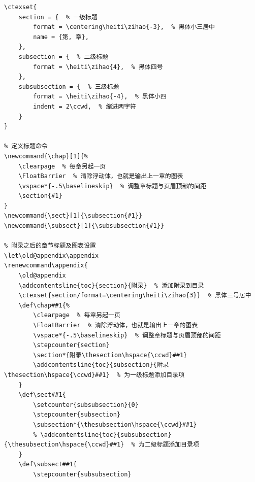 \begin{lstlisting}[numbers=none,frame=none]
% 章节标题
\ctexset{
	section = {  % 一级标题
		format = \centering\heiti\zihao{-3},  % 黑体小三居中
		name = {第, 章},
	},
	subsection = {  % 二级标题
		format = \heiti\zihao{4},  % 黑体四号
	},
	subsubsection = {  % 三级标题
		format = \heiti\zihao{-4},  % 黑体小四
        indent = 2\ccwd,  % 缩进两字符
	}
}

% 定义标题命令
\newcommand{\chap}[1]{%
	\clearpage  % 每章另起一页
    \FloatBarrier  % 清除浮动体，也就是输出上一章的图表
    \vspace*{-.5\baselineskip}  % 调整章标题与页眉顶部的间距
	\section{#1}
}
\newcommand{\sect}[1]{\subsection{#1}}
\newcommand{\subsect}[1]{\subsubsection{#1}}

% 附录之后的章节标题及图表设置
\let\old@appendix\appendix
\renewcommand\appendix{
    \old@appendix
    \addcontentsline{toc}{section}{附录}  % 添加附录到目录
    \ctexset{section/format=\centering\heiti\zihao{3}}  % 黑体三号居中
    \def\chap##1{%
        \clearpage  % 每章另起一页
        \FloatBarrier  % 清除浮动体，也就是输出上一章的图表
        \vspace*{-.5\baselineskip}  % 调整章标题与页眉顶部的间距
        \stepcounter{section}
        \section*{附录\thesection\hspace{\ccwd}##1}
        \addcontentsline{toc}{subsection}{附录\thesection\hspace{\ccwd}##1}  % 为一级标题添加目录项
    }
    \def\sect##1{
        \setcounter{subsubsection}{0}
        \stepcounter{subsection}
        \subsection*{\thesubsection\hspace{\ccwd}##1}
        % \addcontentsline{toc}{subsubsection}{\thesubsection\hspace{\ccwd}##1}  % 为二级标题添加目录项
    }
    \def\subsect##1{
        \stepcounter{subsubsection}

\end{lstlisting}
